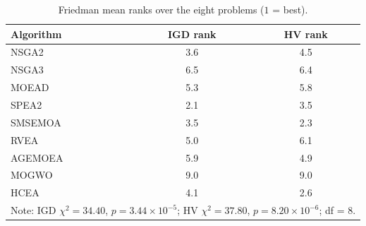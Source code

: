\begin{table}[t]
\centering
\caption{Friedman mean ranks over the eight problems ($1$ = best).}
\label{tab:friedman}
\begin{tabular}{lcc}
\toprule
Algorithm & IGD rank & HV rank \\
\midrule
NSGA2 & 3.6 & 4.5 \\
NSGA3 & 6.5 & 6.4 \\
MOEAD & 5.3 & 5.8 \\
SPEA2 & 2.1 & 3.5 \\
SMSEMOA & 3.5 & 2.3 \\
RVEA & 5.0 & 6.1 \\
AGEMOEA & 5.9 & 4.9 \\
MOGWO & 9.0 & 9.0 \\
HCEA & 4.1 & 2.6 \\
\midrule
\multicolumn{3}{l}{\footnotesize Note: IGD $\chi^2=34.40$, $p=3.44\times10^{-5}$; HV $\chi^2=37.80$, $p=8.20\times10^{-6}$; df = 8.}\\
\bottomrule
\end{tabular}
\end{table}
